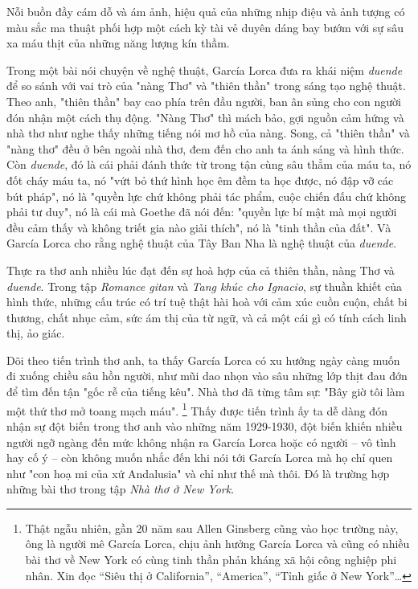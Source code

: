 \documentclass[../main.tex]{subfiles}
\begin{document}
\begin{multicols}{2}
Nỗi buồn đầy cám dỗ và ám ảnh, hiệu quả của những nhịp điệu và ảnh tượng có màu sắc ma thuật phối hợp một cách kỳ tài vẻ duyên dáng bay bướm với sự sâu xa máu thịt của những năng lượng kín thầm. 
 
Trong một bài nói chuyện về nghệ thuật, García Lorca đưa ra khái niệm \textit{duende} để so sánh với vai trò của "nàng Thơ" và "thiên thần" trong sáng tạo nghệ thuật. Theo anh, "thiên thần" bay cao phía trên đầu người, ban ân sủng cho con người đón nhận một cách thụ động. "Nàng Thơ" thì mách bảo, gợi nguồn cảm hứng và nhà thơ như nghe thấy những tiếng nói mơ hồ của nàng. Song, cả "thiên thần" và "nàng thơ" đều ở bên ngoài nhà thơ, đem đến cho anh ta ánh sáng và hình thức. Còn \textit{duende}, đó là cái phải đánh thức từ trong tận cùng sâu thẳm của máu ta, nó đốt cháy máu ta, nó "vứt bỏ thứ hình học êm đềm ta học được, nó đập vỡ các bút pháp", nó là "quyền lực chứ không phải tác phẩm, cuộc chiến đấu chứ không phải tư duy", nó là cái mà Goethe đã nói đến: "quyền lực bí mật mà mọi người đều cảm thấy và không triết gia nào giải thích", nó là "tinh thần của đất". Và García Lorca cho rằng nghệ thuật của Tây Ban Nha là nghệ thuật của \textit{duende}. 
 
Thực ra thơ anh nhiều lúc đạt đến sự hoà hợp của cả thiên thần, nàng Thơ và \textit{duende}. Trong tập \textit{Romance gitan} và \textit{Tang khúc cho Ignacio}, sự thuần khiết của hình thức, những cấu trúc có trí tuệ thật hài hoà với cảm xúc cuồn cuộn, chất bi thương, chất nhục cảm, sức ám thị của từ ngữ, và cả một cái gì có tính cách linh thị, ảo giác. 
 
Dõi theo tiến trình thơ anh, ta thấy García Lorca có xu hướng ngày càng muốn đi xuống chiều sâu hồn người, như mũi dao nhọn vào sâu những lớp thịt đau đớn để tìm đến tận "gốc rễ của tiếng kêu". Nhà thơ đã từng tâm sự: "Bây giờ tôi làm một thứ thơ mở toang mạch máu". \footnote{
Thật ngẫu nhiên, gần 20 năm sau Allen Ginsberg cũng vào học trường này, ông là người mê García Lorca, chịu ảnh hưởng García Lorca và cũng có nhiều bài thơ về New York có cùng tinh thần phản kháng xã hội công nghiệp phi nhân. Xin đọc “Siêu thị ở California”, “America”, “Tỉnh giấc ở New York”…}  Thấy được tiến trình ấy ta dễ dàng đón nhận sự đột biến trong thơ anh vào những năm 1929-1930, đột biến khiến nhiều người ngỡ ngàng đến mức không nhận ra García Lorca hoặc có người – vô tình hay cố ý – còn không muốn nhắc đến khi nói tới García Lorca mà họ chỉ quen như "con hoạ mi của xứ Andalusia" và chỉ như thế mà thôi. Đó là trường hợp những bài thơ trong tập \textit{Nhà thơ ở New York}. 
 

\end{multicols}
\end{document}
